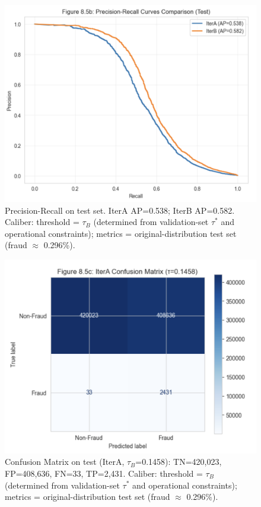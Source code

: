 \documentclass[sigplan,screen]{acmart}
\begin{document}
\begin{figure}[h!]
    \centering
    \includegraphics[width=0.9\columnwidth]{8.5b.png}
    \caption{Precision-Recall on test set. IterA AP=0.538; IterB AP=0.582. Caliber: threshold = $\tau_B$ (determined from validation-set $\tau^*$ and operational constraints); metrics = original-distribution test set (fraud $\approx$ 0.296\%).}
    \label{fig:8.5b}
\end{figure}

\begin{figure}[h!]
    \centering
    \includegraphics[width=0.9\columnwidth]{8.5c.png}
    \caption{Confusion Matrix on test (IterA, $\tau_B$=0.1458): TN=420,023, FP=408,636, FN=33, TP=2,431. Caliber: threshold = $\tau_B$ (determined from validation-set $\tau^*$ and operational constraints); metrics = original-distribution test set (fraud $\approx$ 0.296\%).}
    \label{fig:8.5c}
\end{figure}
\end{document}
